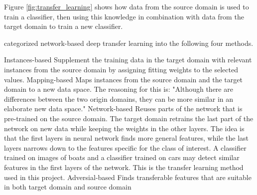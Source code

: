 Figure \ref{fig:transfer_learning} shows how data from the source domain is used to train a classifier, then using this knowledge in combination with data from the target domain to train a new classifier. 

\vspace{3mm}

\citep{TransferLearning2} categorized network-based deep transfer learning into the following four methods.

\begin{outline}
    \1 Instances-based
       \2 Supplement the training data in the target domain with relevant instances from the source domain by assigning fitting weights to the selected values.
    \1 Mapping-based
       \2 Maps instances from the source domain and the target domain to a new data space. The reasoning for this is: "Although there are differences between the two origin domains, they can be more similar in an elaborate new data space." \citep{TransferLearning2}
    \1 Network-based
       \2 Reuses parts of the network that is pre-trained on the source domain. The target domain retrains the last part of the network on new data while keeping the weights in the other layers. The idea is that the first layers in neural network finds more general features, while the last layers narrows down to the features specific for the class of interest. A classifier trained on images of boats and a classifier trained on cars may detect similar features in the first layers of the network. This is the transfer learning method used in this project.
    \1 Adversial-based
       \2 Finds transferable features that are suitable in both target domain and source domain
\end{outline}



\cleardoublepage